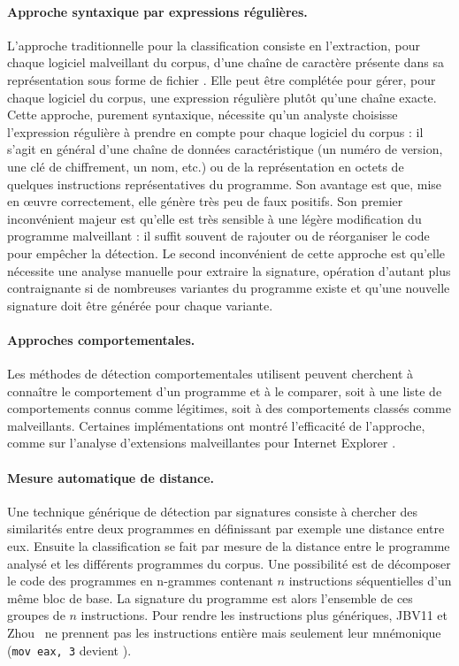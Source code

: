 \paragraph{Approche syntaxique par expressions régulières.}
L'approche traditionnelle pour la classification consiste en l'extraction, pour chaque logiciel malveillant du corpus, d'une chaîne de caractère présente dans sa représentation sous forme de fichier \cite{Szor05}.
Elle peut être complétée pour gérer, pour chaque logiciel du corpus, une expression régulière plutôt qu'une chaîne exacte.
Cette approche, purement syntaxique, nécessite qu'un analyste choisisse l'expression régulière à prendre en compte pour chaque logiciel du corpus : il s'agit en général d'une chaîne de données caractéristique (un numéro de version, une clé de chiffrement, un nom, etc.) ou de la représentation en octets de quelques instructions représentatives du programme.
Son avantage est que, mise en \oe uvre correctement, elle génère très peu de faux positifs. Son premier inconvénient majeur est qu'elle est très sensible à une légère modification du programme malveillant : il suffit souvent de rajouter ou de réorganiser le code pour empêcher la détection. Le second inconvénient de cette approche est qu'elle nécessite une analyse manuelle pour extraire la signature, opération d'autant plus contraignante si de nombreuses variantes du programme existe et qu'une nouvelle signature doit être générée pour chaque variante.

\paragraph{Approches comportementales.}
Les méthodes de détection comportementales utilisent peuvent cherchent à connaître le comportement d'un programme et à le comparer, soit à une liste de comportements connus comme légitimes, soit à des comportements classés comme malveillants.
Certaines implémentations ont montré l'efficacité de l'approche, comme sur l'analyse d'extensions malveillantes pour Internet Explorer \cite{KKBVK06}.

\paragraph{Mesure automatique de distance.}
Une technique générique de détection par signatures consiste à chercher des similarités entre deux programmes en définissant par exemple une distance entre eux. 
Ensuite la classification se fait par mesure de la distance entre le programme analysé et les différents programmes du corpus.
Une possibilité est de décomposer le code des programmes en n-grammes contenant $n$ instructions séquentielles d'un même bloc de base. La signature du programme est alors l'ensemble de ces groupes de $n$ instructions. Pour rendre les instructions plus génériques, JBV11 et Zhou~\cite{UZ13} ne prennent pas les instructions entière mais seulement leur mnémonique (\texttt{mov eax, 3} devient \mov).

